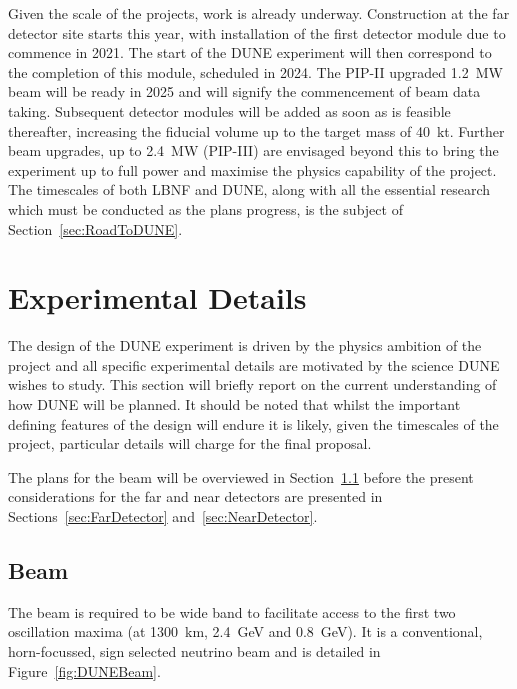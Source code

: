 Given the scale of the projects, work is already underway.  Construction at the far detector site starts this year, with installation of the first detector module due to commence in 2021.  The start of the DUNE experiment will then correspond to the completion of this module, scheduled in 2024.  The PIP-II upgraded 1.2~MW beam will be ready in 2025 and will signify the commencement of beam data taking.  Subsequent detector modules will be added as soon as is feasible thereafter, increasing the fiducial volume up to the target mass of 40~kt.  Further beam upgrades, up to 2.4~MW (PIP-III) are envisaged beyond this to bring the experiment up to full power and maximise the physics capability of the project.  The timescales of both LBNF and DUNE, along with all the essential research which must be conducted as the plans progress, is the subject of Section~\ref{sec:RoadToDUNE}.

\section{Experimental Details}\label{sec:DUNEExperiment}

The design of the DUNE experiment is driven by the physics ambition of the project and all specific experimental details are motivated by the science DUNE wishes to study.  This section will briefly report on the current understanding of how DUNE will be planned.  It should be noted that whilst the important defining features of the design will endure it is likely, given the timescales of the project, particular details will charge for the final proposal.

The plans for the beam will be overviewed in Section~\ref{sec:DUNEBeam} before the present considerations for the far and near detectors are presented in Sections~\ref{sec:FarDetector} and~\ref{sec:NearDetector}.

\subsection{Beam}\label{sec:DUNEBeam}

The beam is required to be wide band to facilitate access to the first two oscillation maxima (at 1300~km, 2.4~GeV and 0.8~GeV).  It is a conventional, horn-focussed, sign selected neutrino beam and is detailed in Figure~\ref{fig:DUNEBeam}.

